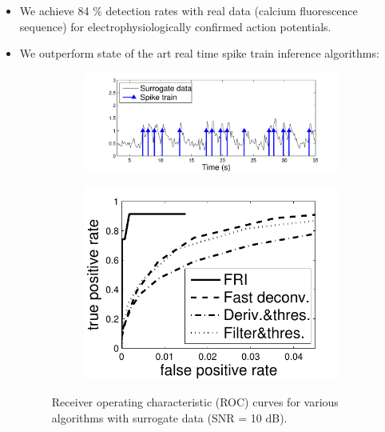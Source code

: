 \documentclass[8pt]{beamer}
\begin{document}
\begin{frame}


\begin{itemize}

\item<1-> We achieve 84 \% detection rates with real data (calcium fluorescence sequence)
for electrophysiologically confirmed action potentials.\\[.3cm]

\item<2-> We outperform state of the art real time spike train inference algorithms:

\begin{figure}[h]
\begin{subfigure}{.55\textwidth}
\includegraphics[width=\linewidth]{figures/surrogate_data}
\end{subfigure}
\begin{subfigure}{.35\textwidth}
\includegraphics[width=\linewidth]{figures/surrogate_roc_10dB}
\end{subfigure}
\caption{Receiver operating characteristic (ROC) curves for various algorithms with
surrogate data (SNR = 10 dB).}
\end{figure}


\end{itemize}
\end{frame}
\end{document}
